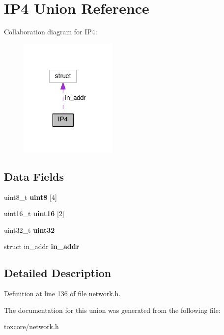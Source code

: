 \hypertarget{union_i_p4}{\section{I\+P4 Union Reference}
\label{union_i_p4}
}


Collaboration diagram for I\+P4\+:\nopagebreak
\begin{figure}[H]
\begin{center}
\leavevmode
\includegraphics[width=136pt]{union_i_p4__coll__graph}
\end{center}
\end{figure}
\subsection*{Data Fields}
\begin{DoxyCompactItemize}
\item 
\hypertarget{union_i_p4_a73b9a57544f1edd6e2187aca636c75ef}{uint8\+\_\+t {\bfseries uint8} \mbox{[}4\mbox{]}}\label{union_i_p4_a73b9a57544f1edd6e2187aca636c75ef}

\item 
\hypertarget{union_i_p4_ac29b55876c4db8c2e69e138039fb7a8a}{uint16\+\_\+t {\bfseries uint16} \mbox{[}2\mbox{]}}\label{union_i_p4_ac29b55876c4db8c2e69e138039fb7a8a}

\item 
\hypertarget{union_i_p4_a5ad776be1fb768f3399aafcd1b58b3a2}{uint32\+\_\+t {\bfseries uint32}}\label{union_i_p4_a5ad776be1fb768f3399aafcd1b58b3a2}

\item 
\hypertarget{union_i_p4_a5a47f63dce37e6eb6be40f022434b1c5}{struct in\+\_\+addr {\bfseries in\+\_\+addr}}\label{union_i_p4_a5a47f63dce37e6eb6be40f022434b1c5}

\end{DoxyCompactItemize}


\subsection{Detailed Description}


Definition at line 136 of file network.\+h.



The documentation for this union was generated from the following file\+:\begin{DoxyCompactItemize}
\item 
toxcore/network.\+h\end{DoxyCompactItemize}
